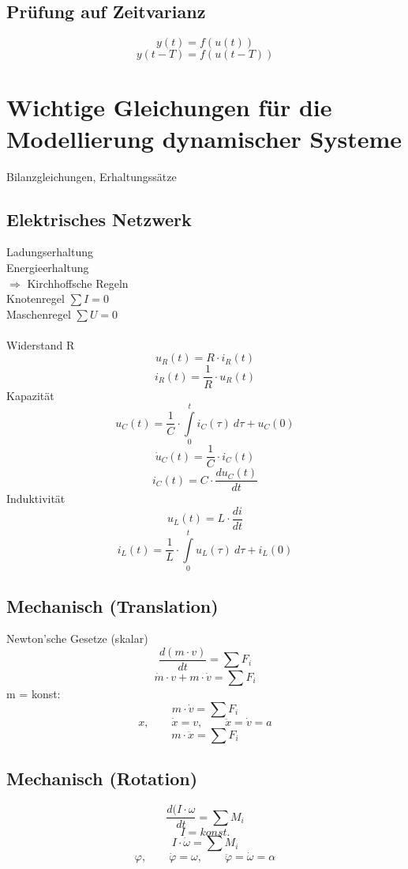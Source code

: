 \subsection{Prüfung auf Zeitvarianz}
\[ y(t) = f(u(t)) \]
\[ y(t - T) = f(u(t - T)) \]

\section{Wichtige Gleichungen für die Modellierung dynamischer Systeme}

Bilanzgleichungen, Erhaltungssätze
\subsection{Elektrisches Netzwerk}
Ladungserhaltung \\
Energieerhaltung \\
$\Rightarrow$ Kirchhoffsche Regeln \\
Knotenregel $\sum I = 0$ \\
Maschenregel $\sum U = 0$ \\\\
Widerstand R
\[ \boxed{u_R(t) = R \cdot i_R(t)} \]
\[ \boxed{i_R(t) = \frac{1}{R} \cdot u_R(t)} \]
Kapazität
\[ \boxed{u_C(t) 
= \frac{1}{C} \cdot \int\limits_{0}^{t} i_C(\tau) ~ d\tau + u_C(0)} \]
\[ \boxed{\dot{u}_C(t) = \frac{1}{C} \cdot i_C(t)} \]
\[ \boxed{i_C(t) = C \cdot \frac{d u_C(t)}{d t}} \]
Induktivität
\[ \boxed{u_L(t) = L \cdot \frac{d i}{d t}} \]
\[ \boxed{i_L(t) 
= \frac{1}{L} \cdot \int\limits_{0}^{t} u_L(\tau) ~ d\tau + i_L(0)} \]

\subsection{Mechanisch (Translation)}
Newton'sche Gesetze (skalar)
\[ \boxed{\frac{d(m \cdot v)}{dt} = \sum F_i} \]
\[ \boxed{\dot{m} \cdot v + m \cdot \dot{v} = \sum F_i} \]
m = konst: 
\[ \boxed{m \cdot \dot{v} = \sum F_i} \]
\[ \boxed{x, \qquad \dot{x} = v, \qquad \ddot{x} = \dot{v} = a} \]
\[ \boxed{m \cdot \ddot{x} = \sum F_i} \]

\subsection{Mechanisch (Rotation)}
\[ \boxed{\frac{d(I \cdot \omega}{dt} = \sum M_i} \]
\[ \boxed{I = konst. } \]
\[ \boxed{I \cdot \dot{\omega} = \sum M_i} \]
\[ \boxed{\varphi, \qquad \dot{\varphi} = \omega, 
\qquad \ddot{\varphi} = \dot{\omega} = \alpha} \]

